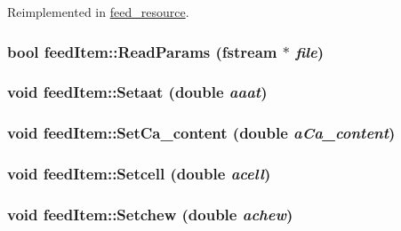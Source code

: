 Reimplemented in \hyperlink{classfeed__resource_af85c55e18f378ff9f64c962450237989}{feed\_\-resource}.\hypertarget{classfeed_item_ae5e9716346904aac836c5c3c2f49de3c}{
\subsubsection[{ReadParams}]{\setlength{\rightskip}{0pt plus 5cm}bool feedItem::ReadParams (fstream $\ast$ {\em file})}}
\label{classfeed_item_ae5e9716346904aac836c5c3c2f49de3c}
\hypertarget{classfeed_item_a5383fd234b023fc02524e43f6120b7f1}{
\subsubsection[{Setaat}]{\setlength{\rightskip}{0pt plus 5cm}void feedItem::Setaat (double {\em aaat})}}
\label{classfeed_item_a5383fd234b023fc02524e43f6120b7f1}
\hypertarget{classfeed_item_a2d486d396496328acb2e582f893ec4de}{
\subsubsection[{SetCa\_\-content}]{\setlength{\rightskip}{0pt plus 5cm}void feedItem::SetCa\_\-content (double {\em aCa\_\-content})}}
\label{classfeed_item_a2d486d396496328acb2e582f893ec4de}
\hypertarget{classfeed_item_abbdbf6ffa1e77cd9fb8b4ba313caae2c}{
\subsubsection[{Setcell}]{\setlength{\rightskip}{0pt plus 5cm}void feedItem::Setcell (double {\em acell})}}
\label{classfeed_item_abbdbf6ffa1e77cd9fb8b4ba313caae2c}
\hypertarget{classfeed_item_a4e2a499cdafc37014f23df3f07dcad23}{
\subsubsection[{Setchew}]{\setlength{\rightskip}{0pt plus 5cm}void feedItem::Setchew (double {\em achew})}}
